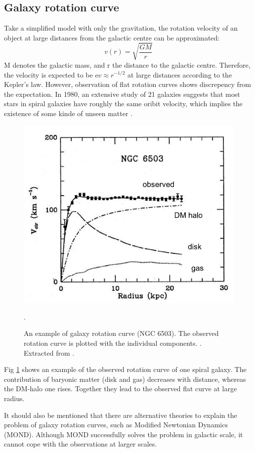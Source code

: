 \subsection*{Galaxy rotation curve}
Take a simplified model with only the gravitation, the rotation velocity of an object at large distances from the galactic centre can be approximated:
\begin{equation}
  v(r)=\sqrt{\frac{GM}{r}}
\end{equation}
M denotes the galactic mass, and r the distance to the galactic centre. Therefore, the velocity is expected to be e$v \approx r^{-1/2}$ at large distances according to the Kepler's law. However, observation of flat rotation curves shows discrepency from the expectation. In 1980, an extensive study of 21 galaxies suggests that most stars in spiral galaxies have roughly the same oribit velocity, which implies the existence of some kinde of unseen matter \cite{Rub80}.
\begin{figure}[ht]
  \centering
  \includegraphics[width=0.75\textwidth{}]{./fig/rotation_curve.png}
  \caption{ An example of galaxy rotation curve (NGC 6503). The observed rotation curve is plotted with the individual components.
  . Extracted from \cite{Rub80}.}.
  \label{fig:rotation-curve}
\end{figure}
Fig \ref{fig:rotation-curve} shows an example of the observed rotation curve of one spiral galaxy. The contribution of baryonic matter (disk and gas) decreases with distance, whereas the DM-halo one rises. Together they lead to the observed flat curve at large radius.

It should also be mentioned that there are alternative theories to explain the problem of galaxy rotation curves, such as Modified Newtonian Dynamics (MOND). Although MOND successfully solves the problem in galactic scale, it cannot cope with the observations at larger scales.

